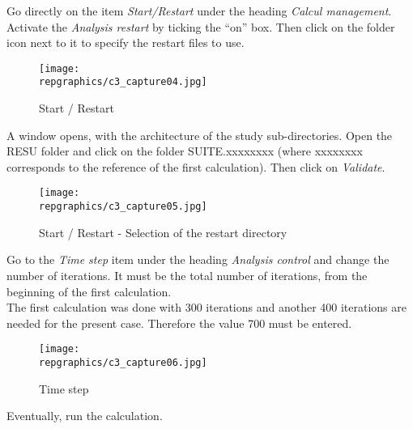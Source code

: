 Go directly on the item {\itshape Start/Restart} under the heading
{\itshape Calcul management}.  Activate the {\itshape Analysis restart}
by ticking the ``on'' box. Then click on the folder icon next to it to specify
the restart files to use.

\begin{figure}[h!]
\begin{center}
\texttt{[image: \\repgraphics/c3\_capture04.jpg]}
\caption{Start / Restart}
\label{fig4_e3}
\end{center}
\end{figure}


\newpage
A window opens, with the architecture of the study sub-directories. Open the
RESU folder and click on the folder SUITE.xxxxxxxx (where xxxxxxxx corresponds
to the reference of the first calculation). Then click on {\itshape Validate}.

\begin{figure}[h!]
\begin{center}
\texttt{[image: \\repgraphics/c3\_capture05.jpg]}
\caption{Start / Restart - Selection of the restart directory}
\label{fig5_e3}
\end{center}
\end{figure}


\newpage
Go to the {\itshape Time step} item under the heading {\itshape Analysis
control} and change the number of iterations. It must be the total number of
iterations, from the beginning of the first calculation.\\

The first calculation was done with 300 iterations and another 400 iterations
are needed for the present case. Therefore the value 700 must be entered.

\begin{figure}[h!]
\begin{center}
\texttt{[image: \\repgraphics/c3\_capture06.jpg]}
\caption{Time step}
\label{fig6_e3}
\end{center}
\end{figure}

Eventually, run the calculation.
